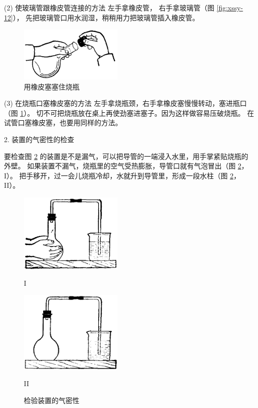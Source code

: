 (2) 使玻璃管跟橡皮管连接的方法 \quad 左手拿橡皮管，
右手拿玻璃管（图 \ref{fig:xssy-12}）， 先把玻璃管口用水润湿，稍稍用力把玻璃管插入橡皮管。

\begin{figure}
    \centering
    \includegraphics[width=5cm]{../pic/czhx1-xssy-13}
    \caption{用橡皮塞塞住烧瓶}\label{fig:xssy-13}
\end{figure}

(3) 在烧瓶口塞橡皮塞的方法 \quad 左手拿烧瓶颈，右手拿橡皮塞慢慢转动，塞进瓶口（图 \ref{fig:xssy-13}）。
切不可把烧瓶放在桌上再使劲塞进塞子。因为这样做容易压破烧瓶。
在试管口塞橡皮塞，也要用同样的方法。


2. 装置的气密性的检查

要检查图 \ref{fig:xssy-14} 的装置是不是漏气，可以把导管的一端浸入水里，用手掌紧贴烧瓶的外壁。
如果装置不漏气，烧瓶里的空气受热膨胀，导管口就有气泡冒出（图 \ref{fig:xssy-14}，I）。
把手移开，过一会儿烧瓶冷却，水就升到导管里，形成一段水柱（图 \ref{fig:xssy-14}，II）。

\begin{figure}[htbp]
    \centering
    \begin{minipage}[b]{7cm}
        \centering
        \includegraphics[width=5cm]{../pic/czhx1-xssy-14-1}
        \caption*{I}
    \end{minipage}
    \qquad
    \begin{minipage}[b]{7cm}
        \centering
        \includegraphics[width=5cm]{../pic/czhx1-xssy-14-2}
        \caption*{II}
    \end{minipage}
    \caption{检验装置的气密性}\label{fig:xssy-14}
\end{figure}

